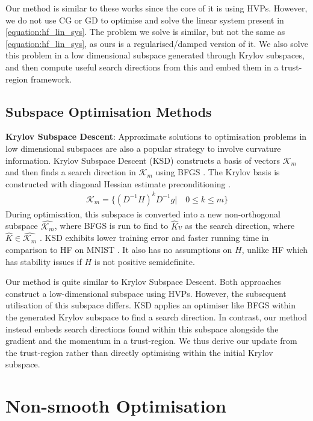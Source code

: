 Our method is similar to these works since the core of it is using HVPs. However, we do not use CG or GD to optimise and solve the linear system present in \cref{equation:hf_lin_sys}. The problem we solve is similar, but not the same as \cref{equation:hf_lin_sys}, as ours is a regularised/damped version of it. We also solve this problem in a low dimensional subspace generated through Krylov subspaces, and then compute useful search directions from this and embed them in a trust-region framework.

\subsection{Subspace Optimisation Methods}
\label{ssec:subspace_opt_methods}

\textbf{Krylov Subspace Descent}: Approximate solutions to optimisation problems in low dimensional subspaces are also a popular strategy to involve curvature information. Krylov Subspace Descent (KSD) constructs a basis of vectors $\mathcal{K}_m$ and then finds a search direction in $\mathcal{K}_m$ using BFGS \citep{vinyals2012krylov}. The Krylov basis is constructed with diagonal Hessian estimate preconditioning \citep{vinyals2012krylov}.
\begin{align}
    \mathcal{K}_m = \{(D^{-1}H)^{k}D^{-1}g | \quad 0 \leq k \leq m \}
\end{align}
During optimisation, this subspace is converted into a new non-orthogonal subspace $\hat{\mathcal{K}_m}$, where BFGS is run to find to ${\hat{K}v}$ as the search direction, where $\hat{K} \in \hat{\mathcal{K}_m}$ \citep{vinyals2012krylov}. KSD exhibits lower training error and faster running time in comparison to HF on MNIST \citep{vinyals2012krylov}. It also has no assumptions on $H$, unlike HF which has stability issues if $H$ is not positive semidefinite.

Our method is quite similar to Krylov Subspace Descent. Both approaches construct a low-dimensional subspace using HVPs. However, the subsequent utilisation of this subspace differs. KSD applies an optimiser like BFGS within the generated Krylov subspace to find a search direction. In contrast, our method instead embeds search directions found within this subspace alongside the gradient and the momentum in a trust-region. We thus derive our update from the trust-region rather than directly optimising within the initial Krylov subspace.  

\section{Non-smooth Optimisation}
\label{sec:non_smooth_optimisation}

